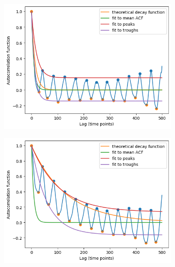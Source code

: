 \begin{figure}
  \centering
  \begin{subfigure}[t]{0.45\textwidth}
  \centering
    \includegraphics[width=\linewidth]{fhn_expofit}
    \caption{
    }
    \label{fig:acf-fhn-noiseparams-fit}
  \end{subfigure}%
  \begin{subfigure}[t]{0.45\textwidth}
  \centering
    \includegraphics[width=\linewidth]{fhn_highnts_expofit}
    \caption{
    }
    \label{fig:acf-fhn-noiseparams-fit-highnts}
  \end{subfigure}


\end{figure}
